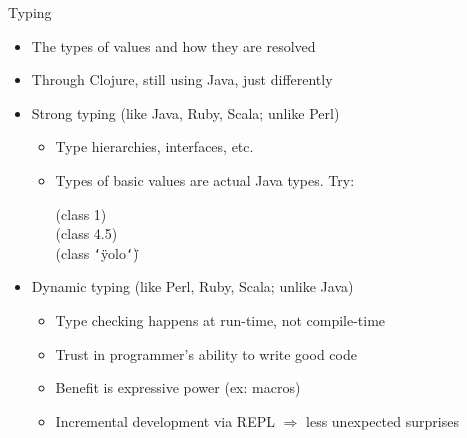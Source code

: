 \documentclass{beamer}
\renewcommand{\textquotedbl}{\texttt{\char`\"}}
\begin{document}
\begin{frame}{Typing}
  \begin{itemize}
  \item The types of values and how they are resolved
  \item Through Clojure, still using Java, just differently
  \item Strong typing (like Java, Ruby, Scala; unlike Perl)
    \begin{itemize}
      \item Type hierarchies, interfaces, etc.
      \item Types of basic values are actual Java types. Try:\\
\begin{ttfamily}
(class 1)\\
(class 4.5)\\
(class \textquotedbl yolo\textquotedbl)
\end{ttfamily}
    \end{itemize}
  \item Dynamic typing (like Perl, Ruby, Scala; unlike Java)
    \begin{itemize}
      \item Type checking happens at run-time, not compile-time
      \item Trust in programmer's ability to write good code
      \item Benefit is expressive power (ex: macros)
      \item Incremental development via REPL $\Rightarrow$ less unexpected
        surprises
    \end{itemize}
  \end{itemize}
\end{frame}
\end{document}
